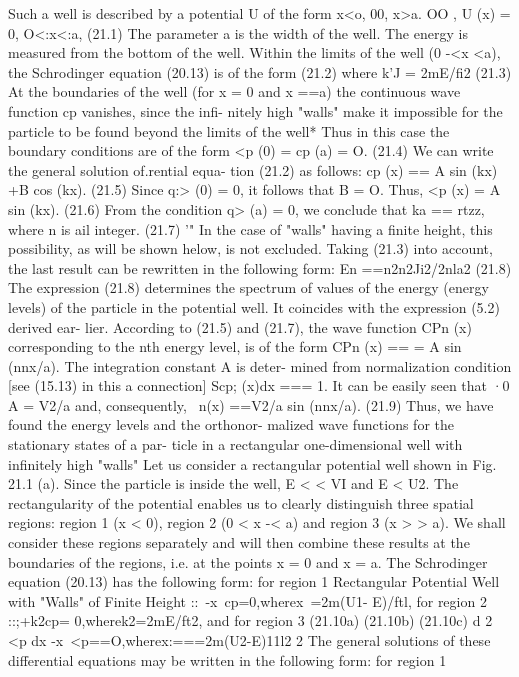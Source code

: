 \documentclass[a4paper,sfsidenotes,colorlinks=true]{tufte-book}
\numberwithin{equation}{section}
\numberwithin{figure}{section}
\begin{document}
{{Such a well is described by a potential U of the form
x<o, { 00, x>a.
OO , U (x) =	0,	O<:x<:a,	(21.1)
The parameter a is the width of the well. The energy is measured from the bottom of the well. Within the limits of the well (0 -<x <a), the Schrodinger equation (20.13) is of the form
(21.2)
where k'J = 2mE/fi2	(21.3)
At the boundaries of the well (for x = 0 and x ==a) the continuous wave function cp vanishes, since the infi- nitely high "walls" make it impossible for the particle to be found beyond the limits of the well* Thus in this case the boundary conditions are of the form
<p (0) = cp (a) = O.	(21.4) We can write the general solution of.rential equa-
tion (21.2) as follows: cp (x) == A sin (kx) +B cos (kx).	(21.5) Since q:> (0) = 0, it follows that B = O. Thus, <p (x) =	A sin (kx).	(21.6) From the condition q> (a) = 0, we conclude that ka == rtzz, where n is ail integer.	(21.7)
'" In the case of "walls" having a finite height, this possibility, as will be shown helow, is not excluded.
Taking (21.3) into account, the last result can be rewritten in the following form:
En ==n2n2Ji2/2nla2	(21.8)
The expression (21.8) determines the spectrum of values of the energy (energy levels) of the particle in the potential well. It coincides with the expression (5.2) derived ear- lier.
According to (21.5) and (21.7), the wave function CPn (x)
corresponding to the nth energy level, is of the form CPn (x) ==
= A sin (nnx/a). The integration constant A is deter-
mined from normalization condition [see (15.13) in this
a
connection] Scp; (x)dx === 1. It can be easily seen that ·0
A = V2/a and, consequently, ~n(x) ==V2/a sin (nnx/a).	(21.9)
Thus, we have found the energy levels and the orthonor- malized wave functions for the stationary states of a par- ticle in a rectangular one-dimensional well with infinitely high "walls"
Let us consider a rectangular potential well shown in Fig. 21.1 (a). Since the particle is inside the well, E < < VI and E < U2. The rectangularity of the potential enables us to clearly distinguish three spatial regions: region 1 (x < 0), region 2 (0 < x -< a) and region 3 (x > > a). We shall consider these regions separately and will then combine these results at the boundaries of the regions, i.e. at the points x = 0 and x = a. The Schrodinger equation (20.13) has the following form: for region 1
Rectangular Potential Well with "Walls" of Finite Height
::~-x~cp=0,wherex~=2m(U1- E)/ftl, for region 2
::;+k2cp= 0,wherek2=2mE/ft2, and for region 3
(21.10a)
(21.10b)
(21.10c)
d 2 <p
dx -x~<p==O,wherex:===2m(U2-E)11l2 2
The general solutions of these differential equations may be written in the following form: for region 1
}}}
\end{document}
